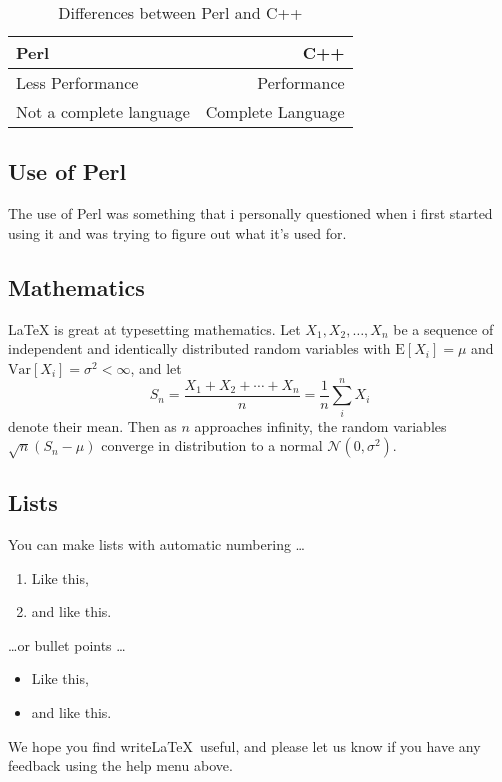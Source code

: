 \documentclass[a4paper,11pt]{article}
\begin{document}
\begin{table}
\centering
\begin{tabular}{l|r}
Perl & C++ \\\hline
Less Performance & Performance \\
Not a complete language & Complete Language
\end{tabular}
\caption{\label{tab:widgets}Differences between Perl and C++}
\end{table}


\subsection{Use of Perl}

The use of Perl was something that i personally questioned when i first started using it and was trying to figure out what it's used for. 



\subsection{Mathematics}

\LaTeX{} is great at typesetting mathematics. Let $X_1, X_2, \ldots, X_n$ be a sequence of independent and identically distributed random variables with $\text{E}[X_i] = \mu$ and $\text{Var}[X_i] = \sigma^2 < \infty$, and let
$$S_n = \frac{X_1 + X_2 + \cdots + X_n}{n}
      = \frac{1}{n}\sum_{i}^{n} X_i$$
denote their mean. Then as $n$ approaches infinity, the random variables $\sqrt{n}(S_n - \mu)$ converge in distribution to a normal $\mathcal{N}(0, \sigma^2)$.

\subsection{Lists}

You can make lists with automatic numbering \dots

\begin{enumerate}
\item Like this,
\item and like this.
\end{enumerate}
\dots or bullet points \dots
\begin{itemize}
\item Like this,
\item and like this.
\end{itemize}

We hope you find write\LaTeX\ useful, and please let us know if you have any feedback using the help menu above.
\end{document}
